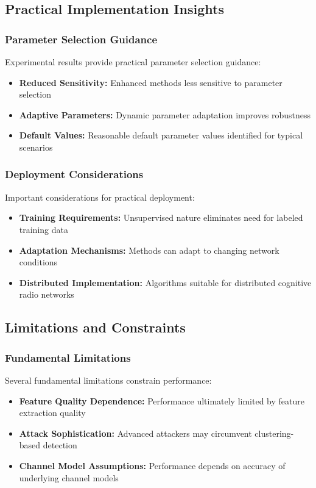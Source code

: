 \subsection{Practical Implementation Insights}

\subsubsection{Parameter Selection Guidance}
Experimental results provide practical parameter selection guidance:
\begin{itemize}
\item \textbf{Reduced Sensitivity:} Enhanced methods less sensitive to parameter selection
\item \textbf{Adaptive Parameters:} Dynamic parameter adaptation improves robustness
\item \textbf{Default Values:} Reasonable default parameter values identified for typical scenarios
\end{itemize}

\subsubsection{Deployment Considerations}
Important considerations for practical deployment:
\begin{itemize}
\item \textbf{Training Requirements:} Unsupervised nature eliminates need for labeled training data
\item \textbf{Adaptation Mechanisms:} Methods can adapt to changing network conditions
\item \textbf{Distributed Implementation:} Algorithms suitable for distributed cognitive radio networks
\end{itemize}

\subsection{Limitations and Constraints}

\subsubsection{Fundamental Limitations}
Several fundamental limitations constrain performance:
\begin{itemize}
\item \textbf{Feature Quality Dependence:} Performance ultimately limited by feature extraction quality
\item \textbf{Attack Sophistication:} Advanced attackers may circumvent clustering-based detection
\item \textbf{Channel Model Assumptions:} Performance depends on accuracy of underlying channel models
\end{itemize}

